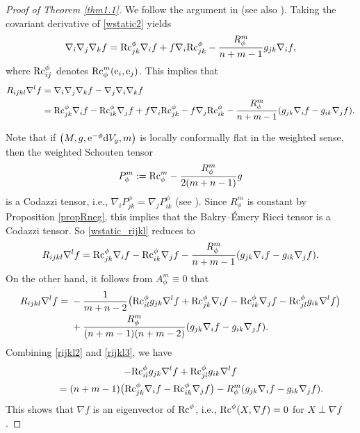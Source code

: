 \documentclass[pdftex]{sigma}
\numberwithin{equation}{section}
\begin{document}
\begin{proof}[Proof of Theorem \ref{thm1.1}]
We follow the argument in \cite{Catino} (see also \cite{He}).
Taking the covariant derivative of \eqref{wstatic2} yields
 \begin{equation*}
 \nabla_i\nabla_j\nabla_kf={\rm Rc}^\phi_{jk}\nabla_if+f\nabla_i{\rm Rc}^\phi_{jk}-\frac{R_\phi^m}{n+m-1}g_{jk}\nabla_if,
 \end{equation*}
 where ${\rm Rc}^\phi_{ij}$ denotes ${\rm Rc}_\phi^m({\rm e}_i,{\rm e}_j)$. This implies that
 \begin{align}\label{wstatic_rijkl}
 R_{ijkl}\nabla^l f& = \nabla_i\nabla_j\nabla_kf-\nabla_j\nabla_i\nabla_kf\\
& = {\rm Rc}^\phi_{jk}\nabla_if-{\rm Rc}^\phi_{ik}\nabla_jf+f\nabla_i{\rm Rc}^\phi_{jk}-f\nabla_j{\rm Rc}^\phi_{ik}
 -\frac{R_\phi^m}{n+m-1}(g_{jk}\nabla_if-g_{ik}\nabla_jf).\nonumber
 \end{align}

Note that if $\bigl(M,g,{\rm e}^{-\phi}{\rm d}V_g,m\bigr)$ is locally conformally flat in the weighted sense, then the weighted Schouten tensor
\[P_\phi^m:={\rm Rc}_\phi^m-\frac{R_\phi^m}{2(m+n-1)}g\] is a Codazzi tensor, i.e., $\nabla_iP^\phi_{jk}=\nabla_jP^\phi_{ik}$ (see \cite[Lemma 3.2]{Case2}). Since $R_\phi^m$ is constant by Proposition \ref{propRneg}, this implies that the Bakry--\'{E}mery Ricci tensor is a Codazzi tensor.
So \eqref{wstatic_rijkl} reduces to
\begin{equation}\label{rijkl2}
 R_{ijkl}\nabla^l f= {\rm Rc}^\phi_{jk}\nabla_if-{\rm Rc}^\phi_{ik}\nabla_jf-\frac{R_\phi^m}{n+m-1}(g_{jk}\nabla_if-g_{ik}\nabla_jf).
 \end{equation}
On the other hand, it follows from $A_\phi^m\equiv 0$ that
\begin{align}\label{rijkl3}
 \nonumber R_{ijkl}\nabla^lf={}&-\frac{1}{m+n-2}\bigl({\rm Rc}^\phi_{il}g_{jk}\nabla^lf+{\rm Rc}^\phi_{jk}\nabla_if-{\rm Rc}_{ik}^\phi\nabla_jf-{\rm Rc}^\phi_{jl}g_{ik}\nabla^lf\bigr)\\
&+\frac{R_\phi^m}{(n+m-1)(n+m-2)}(g_{jk}\nabla_if-g_{ik}\nabla_jf).
\end{align}
Combining \eqref{rijkl2} and \eqref{rijkl3}, we have
\begin{gather}
\nonumber -{\rm Rc}_{il}^\phi g_{jk}\nabla^lf +{\rm Rc}_{jl}^\phi g_{ik}\nabla^lf\\
\qquad{} =(n+m-1)\bigl({\rm Rc}_{jk}^\phi\nabla_if-{\rm Rc}_{ik}^\phi\nabla_jf\bigr)-R_\phi^m(g_{jk}\nabla_if-g_{ik}\nabla_jf).\label{rijkl4}
\end{gather}
 This shows that $\nabla f$ is an eigenvector of ${\rm Rc}^\phi$, i.e., ${\rm Rc}^\phi(X,\nabla f)=0$ for $X\perp \nabla f$.


\end{proof}
\end{document}
